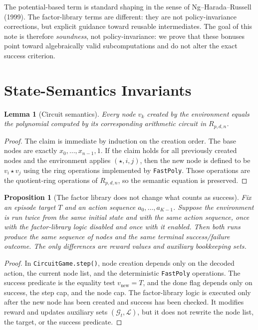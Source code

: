\documentclass[11pt]{article}
\newtheorem{proposition}[theorem]{Proposition}
\newtheorem{lemma}[theorem]{Lemma}
\theoremstyle{remark}
\newcommand{\Llib}{\mathcal{L}}
\newcommand{\Gset}{\mathcal{G}}
\begin{document}
The potential-based term is standard shaping in the sense of
Ng--Harada--Russell (1999). The factor-library terms are different: they are
not policy-invariance corrections, but explicit guidance toward reusable
intermediates. The goal of this note is therefore \emph{soundness}, not
policy-invariance: we prove that these bonuses point toward algebraically valid
subcomputations and do not alter the exact success criterion.

\section{State-Semantics Invariants}

\begin{lemma}[Circuit semantics]
Every node $v_k$ created by the environment equals the polynomial computed by
its corresponding arithmetic circuit in $R_{p,d,n}$.
\end{lemma}

\begin{proof}
The claim is immediate by induction on the creation order. The base nodes are
exactly $x_0,\dots,x_{n-1},1$. If the claim holds for all previously created
nodes and the environment applies $(\star,i,j)$, then the new node is defined
to be $v_i \star v_j$ using the ring operations implemented by
\texttt{FastPoly}. Those operations are the quotient-ring operations of
$R_{p,d,n}$, so the semantic equation is preserved.
\end{proof}

\begin{proposition}[The factor library does not change what counts as success]
Fix an episode target $T$ and an action sequence
$a_0,\dots,a_{K-1}$. Suppose the environment is run twice from the same initial
state and with the same action sequence, once with the factor-library logic
disabled and once with it enabled. Then both runs produce the same sequence of
nodes and the same terminal success/failure outcome. The only differences are
reward values and auxiliary bookkeeping sets.
\end{proposition}

\begin{proof}
In \texttt{CircuitGame.step()}, node creation depends only on the decoded action,
the current node list, and the deterministic \texttt{FastPoly} operations. The
success predicate is the equality test $v_{\mathrm{new}} = T$, and the done flag
depends only on success, the step cap, and the node cap. The factor-library
logic is executed only after the new node has been created and success has been
checked. It modifies reward and updates auxiliary sets
$(\Gset_t,\Llib)$, but it does not rewrite the node list, the target, or the
success predicate.
\end{proof}
\end{document}
